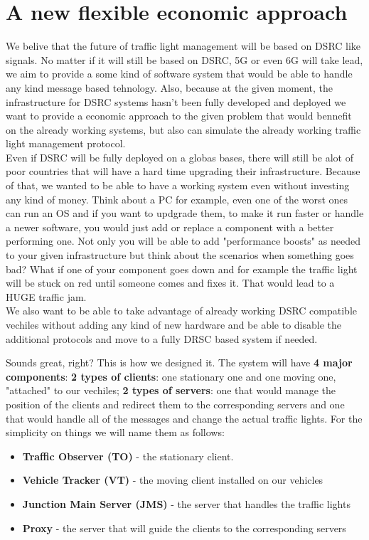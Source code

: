 \documentclass[17pt]{report}
\begin{document}
\chapter{A new flexible economic approach}
\indent \indent
We belive that the future of traffic light management will be
based on DSRC like signals. No matter if it will still be based 
on DSRC, 5G or even 6G will take lead, we aim to provide a some kind of
software system that would be able to handle any kind message based 
tehnology. Also, because at the given moment, the infrastructure for
DSRC systems hasn't been fully developed and deployed we want to
provide a economic approach to the given problem that would bennefit
on the already working systems, but also can simulate the already
working traffic light management protocol.\\
\indent \indent
Even if DSRC will be fully deployed on a globas bases, there will still be
alot of poor countries that will have a hard time upgrading their infrastructure.
Because of that, we wanted to be able to have a working system even without 
investing any kind of money. Think about a PC for example, even one of the worst
ones can run an OS and if you want to updgrade them, to make it run faster or
handle a newer software, you would just add or replace a component with a better
performing one. Not only you will be able to add "performance boosts" as needed
to your given infrastructure but think about the scenarios when something goes bad?
What if one of your component goes down and for example the traffic light will
be stuck on red until someone comes and fixes it. That would lead to a
HUGE traffic jam.\\
\indent \indent
We also want to be able to take advantage of already working DSRC compatible
vechiles without adding any kind of new hardware  and be able to 
disable the additional protocols and move to a fully DRSC based
system if needed.

Sounds great, right? This is how we designed it. The system will have \textbf{4 major
components}: \textbf{2 types of clients}: one stationary one and one moving one, 
"attached" to our vechiles; \textbf{2 types of servers}: one that would manage the
position of the clients and redirect them to the corresponding servers
and one that would handle all of the messages and change the actual traffic lights.
For the simplicity on things we will name them as follows:
\begin{itemize}
    \item \textbf{Traffic Observer (TO)} - the stationary client.
    \item \textbf{Vehicle Tracker (VT)} - the moving client installed on our vehicles
    \item \textbf{Junction Main Server (JMS)} - the server that handles the traffic lights
    \item \textbf{Proxy} - the server that will guide the clients to the corresponding
    servers
\end{itemize}
\end{document}
